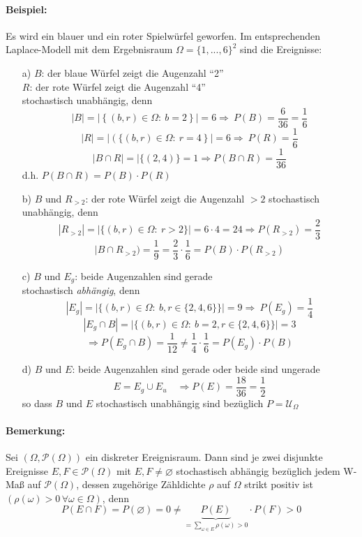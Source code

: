 \documentclass[12pt,a4paper]{article}
\begin{document}
	\paragraph{Beispiel:}
	Es wird ein blauer und ein roter Spielwürfel geworfen. Im entsprechenden Laplace-Modell mit dem Ergebnisraum $\Omega=\{1,...,6\}^2$ sind die Ereignisse:
	\begin{itemize}
	\item[a)] $B$: der blaue Würfel zeigt die Augenzahl ``2''\\
	$R$: der rote Würfel zeigt die Augenzahl ``4''\\	
	stochastisch unabhängig, denn
	$$|B|=|\left\{\left(b,r\right)\in\Omega: \: b=2\right\}|=6 \Rightarrow\: P(B)=\frac{6}{36}=\frac{1}{6}$$
	$$|R|=|\left(\{\left(b,r\right)\in\Omega: \: r=4\right\}|=6 \Rightarrow\: P(R)=\frac{1}{6}$$
	$$|B\cap R|=|\{(2,4)\}=1 \Rightarrow P(B\cap R) =\frac{1}{36}$$
	d.h. $P(B\cap R) = P(B)\cdot P(R)$

	\item[b)] $B$ und $R_{>2}$: der rote Würfel zeigt die Augenzahl $>2$ stochastisch unabhängig, denn 
	$$|R_{>2}| = |\{(b,r)\in\Omega: \: r>2\}| = 6\cdot 4= 24 \Rightarrow P(R_{>2})=\frac{2}{3}$$
	$$|B\cap R_{>2})=\frac{1}{9} = \frac{2}{3} \cdot \frac{1}{6} = P(B) \cdot P(R_{>2})$$

	\item[c)] $B$ und $E_g$: beide Augenzahlen sind gerade \\
	stochastisch \textit{abhängig}, denn
	$$|E_g|=|\{(b,r)\in\Omega : \: b,r\in\{2,4,6\}\}|=9 \Rightarrow\: P(E_g)=\frac{1}{4}$$
	$$|E_g \cap B|=|\{(b,r)\in\Omega : \: b=2,r\in\{2,4,6\}\}|=3 $$
	$$\Rightarrow P(E_g \cap B)= \frac{1}{12}\neq \frac{1}{4} \cdot \frac{1}{6}=P(E_g)\cdot P(B)$$ 
	
	\item[d)] $B$ und $E$: beide Augenzahlen sind gerade oder beide sind ungerade
	$$E=E_g \cup E_u \quad \Rightarrow P(E)=\frac{18}{36}=\frac{1}{2}$$
	so dass $B$ und $E$ stochastisch unabhängig sind bezüglich $P=\mathcal{U}_{\Omega}$
	\end{itemize}
	
	\paragraph{Bemerkung:}
	Sei $\left(\Omega,\mathcal{P}\left(\Omega\right)\right)$ ein diskreter Ereignisraum. Dann sind je zwei disjunkte Ereignisse $E,F\in\mathcal{P}(\Omega)$ mit $E,F\neq\varnothing$ stochastisch abhängig bezüglich jedem W-Maß auf $\mathcal{P}(\Omega)$, dessen zugehörige Zähldichte $\rho$ auf $\Omega$ strikt positiv ist $\left(\rho\left(\omega\right)>0\, \forall \omega\in\Omega\right)$, denn 
	$$P(E\cap F)=P(\varnothing)=0\neq \underbrace{P(E)}_{=\sum_{\omega\in E}\rho(\omega)>0}\cdot P(F)>0$$
	
\end{document}
